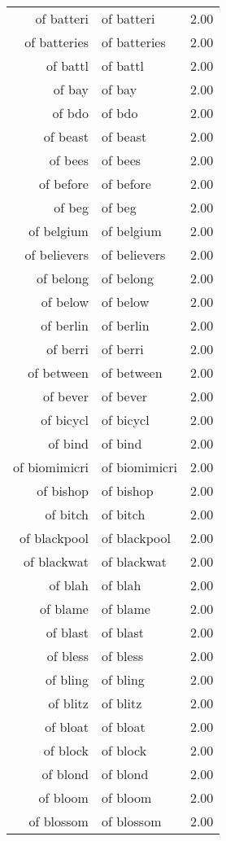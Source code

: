 \begin{table}[ht]
\begin{tabular}{rlr}
  of batteri & of batteri & 2.00 \\ 
  of batteries & of batteries & 2.00 \\ 
  of battl & of battl & 2.00 \\ 
  of bay & of bay & 2.00 \\ 
  of bdo & of bdo & 2.00 \\ 
  of beast & of beast & 2.00 \\ 
  of bees & of bees & 2.00 \\ 
  of before & of before & 2.00 \\ 
  of beg & of beg & 2.00 \\ 
  of belgium & of belgium & 2.00 \\ 
  of believers & of believers & 2.00 \\ 
  of belong & of belong & 2.00 \\ 
  of below & of below & 2.00 \\ 
  of berlin & of berlin & 2.00 \\ 
  of berri & of berri & 2.00 \\ 
  of between & of between & 2.00 \\ 
  of bever & of bever & 2.00 \\ 
  of bicycl & of bicycl & 2.00 \\ 
  of bind & of bind & 2.00 \\ 
  of biomimicri & of biomimicri & 2.00 \\ 
  of bishop & of bishop & 2.00 \\ 
  of bitch & of bitch & 2.00 \\ 
  of blackpool & of blackpool & 2.00 \\ 
  of blackwat & of blackwat & 2.00 \\ 
  of blah & of blah & 2.00 \\ 
  of blame & of blame & 2.00 \\ 
  of blast & of blast & 2.00 \\ 
  of bless & of bless & 2.00 \\ 
  of bling & of bling & 2.00 \\ 
  of blitz & of blitz & 2.00 \\ 
  of bloat & of bloat & 2.00 \\ 
  of block & of block & 2.00 \\ 
  of blond & of blond & 2.00 \\ 
  of bloom & of bloom & 2.00 \\ 
  of blossom & of blossom & 2.00 \\ 

\end{tabular}
\end{table}
